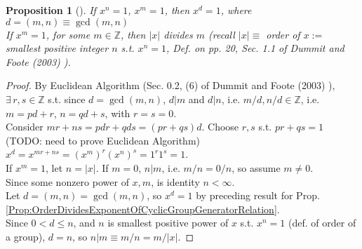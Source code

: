 \documentclass[10pt]{amsart}
\newtheorem{proposition}{Proposition}
\begin{document}
\begin{multicols*}{2}
\begin{proposition}[]
	If $x^n = 1$, $x^m = 1$, then $x^d =1$, where $d= (m,n) \equiv \gcd{(m,n)}$ \\
	If $x^m = 1$, for some $m \in \mathbb{Z}$, then $|x|$ divides $m$ (recall $|x| \equiv $ order of $x :=$ smallest positive integer $n$ s.t. $x^n = 1$, Def. on pp. 20, Sec. 1.1 of Dummit and Foote (2003) \cite{DuFo2003}).
\end{proposition}

\begin{proof}
	By Euclidean Algorithm (Sec. 0.2, (6) of Dummit and Foote (2003) \cite{DuFo2003}), $\exists \, r, s \in \mathbb{Z}$ s.t. since $d= \gcd{(m,n)}$, $d|m$ and $d|n$, i.e. $m/d, n/d \in \mathbb{Z}$, i.e. $m = pd + r$, $n=qd + s$, with $r=s=0$. \\
	
	Consider $mr+ns = pdr + qds = (pr+qs)d$. Choose $r,s$ s.t. $pr + qs = 1$ (TODO: need to prove Euclidean Algorithm) \\

	$x^d = x^{mr + ns} = (x^m)^r (x^n)^s = 1^r 1^s = 1$. \\
	
	If $x^m = 1$, let $n=|x|$. If $m=0$, $n |m$, i.e. $m/n = 0/n$, so assume $m \neq 0$. \\
	
	Since some nonzero power of $x,m$, is identity $n < \infty$. \\
	
	Let $d= (m,n) = \gcd{(m,n)}$, so $x^d = 1$ by preceding result for Prop. \ref{Prop:OrderDividesExponentOfCyclicGroupGeneratorRelation}. \\
	
	Since $0 < d \leq n$, and $n$ is smallest positive power of $x$ s.t. $x^n= 1$ (def. of order of a group), $d=n$, so $n | m \equiv m/n = m / |x|$. 
\end{proof} 


\end{multicols*}
\end{document}
